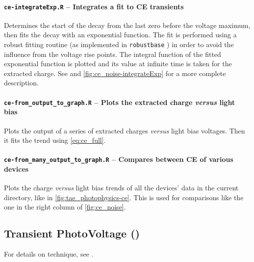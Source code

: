 		\paragraph{\texttt{ce-\-integrateExp.R} -- Integrates a fit to CE transients}
		Determines the start of the  decay from the last zero before the voltage maximum, then fits the decay with an exponential function.
		The fit is performed using a robust fitting routine (as implemented in \texttt{robust\-base} \cite{Maechler2018}) in order to avoid the influence from the voltage rise points.
		The integral function of the fitted exponential function is plotted and its value at infinite time is taken for the extracted charge.
				See  and \cref{fig:ce_noise-integrateExp} for a more complete description.
				
		\paragraph{\texttt{ce-\-from\_output\_to\_graph.R} -- Plots the extracted charge \textsl{versus} light bias}
		Plots the output of a series of extracted charges \textsl{versus} light bias voltages.
		Then it fits the trend using \cref{eq:ce_full}.
		
		\paragraph{\texttt{ce-\-from\_many\_output\_to\_graph.R} -- Compares between CE of various devices}
		Plots the charge \textsl{versus} light bias trends of all the devices' data in the current directory, like in \cref{fig:tae_photophysics-ce}.
		This is used for comparisons like the one in the right column of \cref{fig:ce_noise}.
		

	\subsection{Transient PhotoVoltage ()}\label{r_tpv}
	For details on  technique, see .
	
